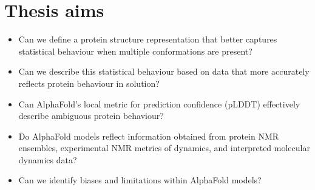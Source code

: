 \chapter*{Thesis aims}

\begin{itemize}
    \item Can we define a protein structure representation that better captures statistical behaviour when multiple conformations are present? 
    \item Can we describe this statistical behaviour based on data that more accurately reflects protein behaviour in solution?
    \item Can AlphaFold’s local metric for prediction confidence (pLDDT) effectively describe ambiguous protein behaviour?
    \item Do AlphaFold models reflect information obtained from protein NMR ensembles, experimental NMR metrics of dynamics, and interpreted molecular dynamics data?
    \item Can we identify biases and limitations within AlphaFold models?
\end{itemize}


